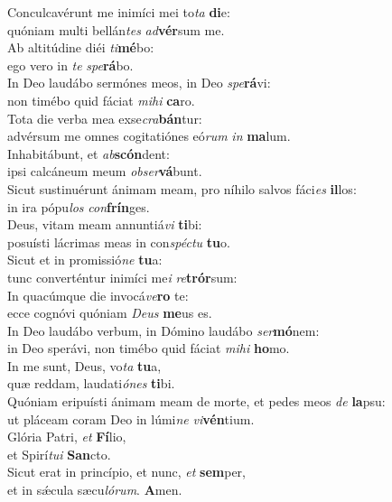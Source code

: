 \evenverse Conculcavérunt me inimíci mei to\textit{ta} \textbf{di}e:~\*\\
\evenverse quóniam multi bellán\textit{tes} \textit{ad}\textbf{vér}sum me.\\
\oddverse Ab altitúdine diéi \textit{ti}\textbf{mé}bo:~\*\\
\oddverse ego vero in \textit{te} \textit{spe}\textbf{rá}bo.\\
\evenverse In Deo laudábo sermónes meos, in Deo \textit{spe}\textbf{rá}vi:~\*\\
\evenverse non timébo quid fáciat \textit{mi}\textit{hi} \textbf{ca}ro.\\
\oddverse Tota die verba mea exse\textit{cra}\textbf{bán}tur:~\*\\
\oddverse advérsum me omnes cogitatiónes eó\textit{rum} \textit{in} \textbf{ma}lum.\\
\evenverse Inhabitábunt, et \textit{ab}\textbf{scón}dent:~\*\\
\evenverse ipsi calcáneum meum \textit{ob}\textit{ser}\textbf{vá}bunt.\\
\oddverse Sicut sustinuérunt ánimam meam, pro níhilo salvos fáci\textit{es} \textbf{il}los:~\*\\
\oddverse in ira pópu\textit{los} \textit{con}\textbf{frín}ges.\\
\evenverse Deus, vitam meam annuntiá\textit{vi} \textbf{ti}bi:~\*\\
\evenverse posuísti lácrimas meas in con\textit{spé}\textit{ctu} \textbf{tu}o.\\
\oddverse Sicut et in promissió\textit{ne} \textbf{tu}a:~\*\\
\oddverse tunc converténtur inimíci me\textit{i} \textit{re}\textbf{trór}sum:\\
\evenverse In quacúmque die invocá\textit{ve}\textbf{ro} te:~\*\\
\evenverse ecce cognóvi quóniam \textit{De}\textit{us} \textbf{me}us es.\\
\oddverse In Deo laudábo verbum, in Dómino laudábo \textit{ser}\textbf{mó}nem:~\*\\
\oddverse in Deo sperávi, non timébo quid fáciat \textit{mi}\textit{hi} \textbf{ho}mo.\\
\evenverse In me sunt, Deus, vo\textit{ta} \textbf{tu}a,~\*\\
\evenverse quæ reddam, laudati\textit{ó}\textit{nes} \textbf{ti}bi.\\
\oddverse Quóniam eripuísti ánimam meam de morte, et pedes meos \textit{de} \textbf{la}psu:~\*\\
\oddverse ut pláceam coram Deo in lúmi\textit{ne} \textit{vi}\textbf{vén}tium.\\
\evenverse Glória Patri, \textit{et} \textbf{Fí}lio,~\*\\
\evenverse et Spirí\textit{tu}\textit{i} \textbf{San}cto.\\
\oddverse Sicut erat in princípio, et nunc, \textit{et} \textbf{sem}per,~\*\\
\oddverse et in sǽcula sæcu\textit{ló}\textit{rum}. \textbf{A}men.\\
